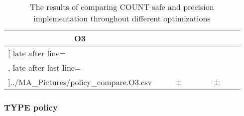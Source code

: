 \begin{table}[!htbp]
{\begin{tabular}{l|c|rcl|c|rcl|c}
\multicolumn{1}{c}{\bfseries O3}
	\\\midrule
	\csvreader[ late after line=\\, late after last line=\\\bottomrule]{../MA_Pictures/policy_compare.O3.csv}{
}
	{\csvcolii  &  \csvcoliii & \csvcoliv & $\pm$ & \csvcolv & \csvcolvi & \csvcolvii & $\pm$ & \csvcolviii& \csvcolix}%

    	\end{tabular}
}
		\caption {The results of comparing COUNT safe and precision implementation throughout different optimizations}
		\label{tbl:policycomp}
\end{table}

\newpage

\subsubsection{TYPE policy}

